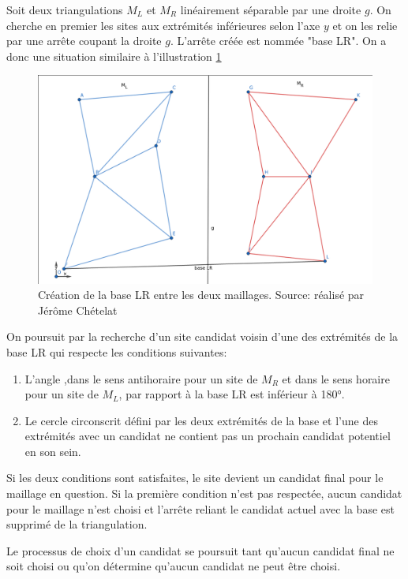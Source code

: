 Soit deux triangulations $M_L$ et $M_R$ linéairement séparable par une droite $g$.
On cherche en premier les sites aux extrémités inférieures selon l'axe $y$ et on les relie par une arrête coupant la droite $g$.
L'arrête créée est nommée "base LR". On a donc une situation similaire à l'illustration \ref{fig:base_lr}

\begin{figure}[!htb]
    \centering
    \includegraphics[width=0.8\linewidth]{figures/base_lr.png}
    \caption{Création de la base LR entre les deux maillages. Source: réalisé par Jérôme Chételat}
    \label{fig:base_lr}
\end{figure}

On poursuit par la recherche d'un site candidat voisin d'une des extrémités de la base LR qui respecte les conditions suivantes:

\begin{enumerate}
    \item L'angle ,dans le sens antihoraire pour un site de $M_R$ et dans le sens horaire pour un site de $M_L$, par rapport à la base LR est inférieur à 180°.
    \item Le cercle circonscrit défini par les deux extrémités de la base et l'une des extrémités avec un candidat ne contient pas un prochain candidat potentiel en son sein.
\end{enumerate}

Si les deux conditions sont satisfaites, le site devient un candidat final pour le maillage en question.
Si la première condition n'est pas respectée, aucun candidat pour le maillage n'est choisi et l'arrête reliant le candidat actuel avec la base est supprimé de la triangulation.

Le processus de choix d'un candidat se poursuit tant qu'aucun candidat final ne soit choisi ou qu'on détermine qu'aucun candidat ne peut être choisi.

